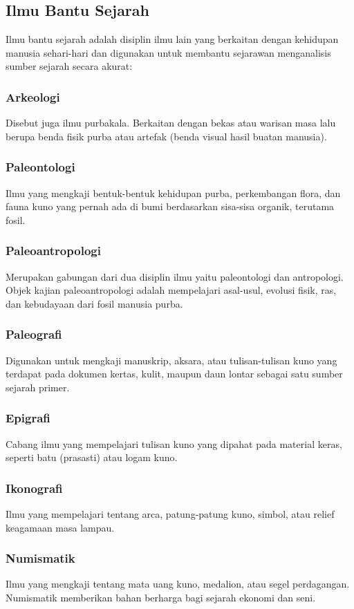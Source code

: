 \documentclass[12pt, a4paper]{article}
\begin{document}
\subsection{Ilmu Bantu Sejarah}
Ilmu bantu sejarah adalah disiplin ilmu lain yang berkaitan dengan kehidupan manusia sehari-hari dan digunakan untuk membantu sejarawan menganalisis sumber sejarah secara akurat:
\subsubsection{Arkeologi}
Disebut juga ilmu purbakala. Berkaitan dengan bekas atau warisan masa lalu berupa benda fisik purba atau artefak (benda visual hasil buatan manusia).
\subsubsection{Paleontologi}
Ilmu yang mengkaji bentuk-bentuk kehidupan purba, perkembangan flora, dan fauna kuno yang pernah ada di bumi berdasarkan sisa-sisa organik, terutama fosil.
\subsubsection{Paleoantropologi}
Merupakan gabungan dari dua disiplin ilmu yaitu paleontologi dan antropologi. Objek kajian paleoantropologi adalah mempelajari asal-usul, evolusi fisik, ras, dan kebudayaan dari fosil manusia purba.
\subsubsection{Paleografi}
Digunakan untuk mengkaji manuskrip, aksara, atau tulisan-tulisan kuno yang terdapat pada dokumen kertas, kulit, maupun daun lontar sebagai satu sumber sejarah primer.
\subsubsection{Epigrafi}
Cabang ilmu yang mempelajari tulisan kuno yang dipahat pada material keras, seperti batu (prasasti) atau logam kuno.
\subsubsection{Ikonografi}
Ilmu yang mempelajari tentang arca, patung-patung kuno, simbol, atau relief keagamaan masa lampau.
\subsubsection{Numismatik}
Ilmu yang mengkaji tentang mata uang kuno, medalion, atau segel perdagangan. Numismatik memberikan bahan berharga bagi sejarah ekonomi dan seni.
\end{document}

